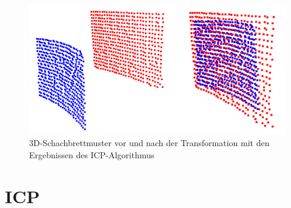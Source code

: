 \begin{figure}[H]
	\includegraphics[scale=1.0]{bilder/icpresult}
	\caption[3D-Schachbrettmuster vor und nach der Transformation mit den Ergebnissen des ICP-Algorithmus]{3D-Schachbrettmuster vor und nach der Transformation mit den Ergebnissen des ICP-Algorithmus}
	\label{fig:icpresult}
\end{figure}

\section{ICP}
\label{sec:icp}